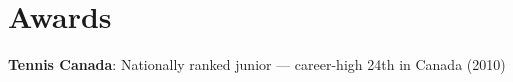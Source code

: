\section{Awards}
 \begin{itemize}[leftmargin=0.15in, label={}]
    \small{\item{
     \textbf{Tennis Canada}{: Nationally ranked junior --- career-high 24th in Canada (2010)}
    }}
 \end{itemize}
